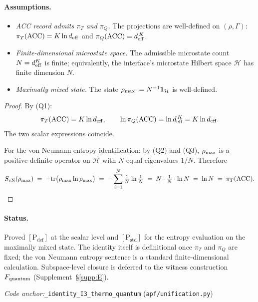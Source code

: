 \documentclass[11pt]{article}
\theoremstyle{plain}
\theoremstyle{definition}
\theoremstyle{remark}
\newcommand{\coderef}[2]{\par\noindent\textit{Code anchor:}\quad\texttt{#1} (\texttt{#2})}
\begin{document}
\paragraph{Assumptions.}
\begin{itemize}[leftmargin=2em,itemsep=2pt]
  \item[\textbf{(Q1)}] \emph{ACC record admits $\pi_T$ and $\pi_Q$.} The projections are well-defined on $(\rho, \Gamma)$: $\pi_T(\mathrm{ACC}) = K \ln d_{\rm eff}$ and $\pi_Q(\mathrm{ACC}) = d_{\rm eff}^{\,K}$.
  \item[\textbf{(Q2)}] \emph{Finite-dimensional microstate space.} The admissible microstate count $N = d_{\rm eff}^K$ is finite; equivalently, the interface's microstate Hilbert space $\mathcal{H}$ has finite dimension $N$.
  \item[\textbf{(Q3)}] \emph{Maximally mixed state.} The state $\rho_{\rm max} := N^{-1} \mathbf{1}_{\mathcal{H}}$ is well-defined.
\end{itemize}

\begin{proof}
By (Q1):
\[
  \pi_T(\mathrm{ACC}) = K \ln d_{\rm eff},
  \qquad
  \ln \pi_Q(\mathrm{ACC}) = \ln d_{\rm eff}^{\,K} = K \ln d_{\rm eff}.
\]
The two scalar expressions coincide.

For the von Neumann entropy identification: by (Q2) and (Q3), $\rho_{\rm max}$ is a positive-definite operator on $\mathcal{H}$ with $N$ equal eigenvalues $1/N$.  Therefore
\[
  S_{\rm vN}(\rho_{\rm max}) \;=\; -\mathrm{tr}\bigl(\rho_{\rm max} \ln \rho_{\rm max}\bigr)
  \;=\; -\sum_{i=1}^{N} \tfrac{1}{N} \ln \tfrac{1}{N}
  \;=\; N \cdot \tfrac{1}{N} \cdot \ln N
  \;=\; \ln N
  \;=\; \pi_T(\mathrm{ACC}).
\]
\end{proof}

\paragraph{Status.}
Proved $[\text{P}_{\mathrm{def}}]$ at the scalar level and $[\text{P}_{\mathrm{std}}]$ for the entropy evaluation on the maximally mixed state.  The identity itself is definitional once $\pi_T$ and $\pi_Q$ are fixed; the von Neumann entropy sentence is a standard finite-dimensional calculation.  Subspace-level closure is deferred to the witness construction $F_{\rm quantum}$ (Supplement~\S\ref{supp:E}).

\coderef{\_identity\_I3\_thermo\_quantum}{apf/unification.py}

\bigskip
\end{document}
